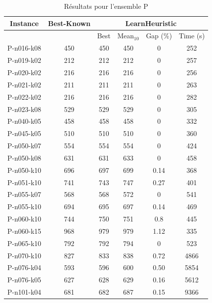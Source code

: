 \documentclass[a4paper,11pt]{article}%
\begin{document}
\begin{table}[h!]
\caption{Résultats pour l'ensemble P}
\label{TP}
\begin{center}
\begin{tabular}{|@{}c@{}|@{}c@{}|@{}c@{}|@{}c@{}|@{}c@{}|@{}c@{}|}

\hline
 Instance & Best-Known & \multicolumn{4}{c|}{LearnHeuristic}  \\
 \hline
 & & Best & Mean$_{10}$ & Gap (\%) & Time (s) \\ 
 \hline
 P-n016-k08 & 450 & 450 & 450 & 0 & 252  \\
 \hline
 P-n019-k02   & 212 & 212 & 212 & 0 & 257   \\
  \hline
   P-n020-k02 & 216 & 216 & 216 &0 & 256  \\
 \hline
   P-n021-k02 & 211 & 211 & 211 &0 & 263  \\
  \hline
   P-n022-k02 & 216 & 216 & 216 & 0 & 282  \\
 \hline
  P-n023-k08  & 529 & 529 & 529 & 0 & 305  \\
  \hline
  P-n040-k05 & 458 & 458 & 458 & 0 & 332 \\
 \hline
  P-n045-k05  & 510 & 510 & 510 & 0 & 360 \\
 \hline
 P-n050-k07 & 554 & 554 & 554 & 0 & 424 \\
 \hline
  P-n050-k08  & 631 & 631 & 633 & 0 & 458   \\
 \hline
   P-n050-k10 & 696 & 697 & 699 & 0.14 & 368   \\
  \hline
   P-n051-k10 & 741 & 743 & 747 & 0.27 & 401  \\
 \hline 
  P-n055-k07  & 568 & 568& 572& 0 & 541  \\
  \hline
  P-n055-k10  & 694 & 695 & 697 &0.14 & 469  \\
  \hline
  P-n060-k10 & 744 & 750 & 751 & 0.8 & 445  \\
 \hline
   P-n060-k15  & 968 & 979 & 979 &1.12 & 335   \\
  \hline
  P-n065-k10  & 792 & 792 & 794 & 0 & 523   \\
  \hline
  P-n070-k10 & 827 & 833 & 838 & 0.72 & 4866    \\
  \hline
  P-n076-k04 & 593 & 596 &600 & 0.50 & 5854 \\
 \hline 
   P-n076-k05 & 627 & 628 & 629 &0.16 & 5612   \\
  \hline 
  P-n101-k04  & 681 & 682 & 687 & 0.15 & 9366  \\
  \hline
\end{tabular}
\end{center}
\end{table}
\end{document}
